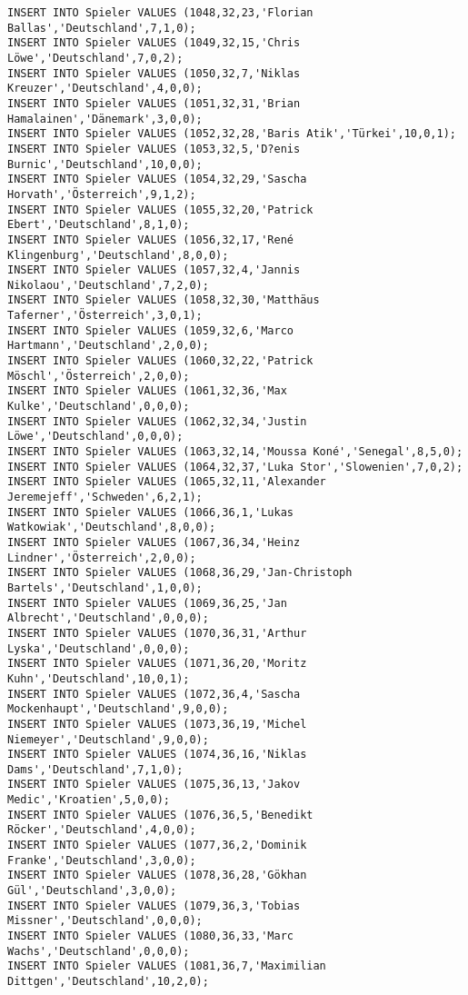 \documentclass{lehramt-informatik-aufgabe}
\begin{document}
\begin{verbatim}
INSERT INTO Spieler VALUES (1048,32,23,'Florian Ballas','Deutschland',7,1,0);
INSERT INTO Spieler VALUES (1049,32,15,'Chris Löwe','Deutschland',7,0,2);
INSERT INTO Spieler VALUES (1050,32,7,'Niklas Kreuzer','Deutschland',4,0,0);
INSERT INTO Spieler VALUES (1051,32,31,'Brian Hamalainen','Dänemark',3,0,0);
INSERT INTO Spieler VALUES (1052,32,28,'Baris Atik','Türkei',10,0,1);
INSERT INTO Spieler VALUES (1053,32,5,'D?enis Burnic','Deutschland',10,0,0);
INSERT INTO Spieler VALUES (1054,32,29,'Sascha Horvath','Österreich',9,1,2);
INSERT INTO Spieler VALUES (1055,32,20,'Patrick Ebert','Deutschland',8,1,0);
INSERT INTO Spieler VALUES (1056,32,17,'René Klingenburg','Deutschland',8,0,0);
INSERT INTO Spieler VALUES (1057,32,4,'Jannis Nikolaou','Deutschland',7,2,0);
INSERT INTO Spieler VALUES (1058,32,30,'Matthäus Taferner','Österreich',3,0,1);
INSERT INTO Spieler VALUES (1059,32,6,'Marco Hartmann','Deutschland',2,0,0);
INSERT INTO Spieler VALUES (1060,32,22,'Patrick Möschl','Österreich',2,0,0);
INSERT INTO Spieler VALUES (1061,32,36,'Max Kulke','Deutschland',0,0,0);
INSERT INTO Spieler VALUES (1062,32,34,'Justin Löwe','Deutschland',0,0,0);
INSERT INTO Spieler VALUES (1063,32,14,'Moussa Koné','Senegal',8,5,0);
INSERT INTO Spieler VALUES (1064,32,37,'Luka Stor','Slowenien',7,0,2);
INSERT INTO Spieler VALUES (1065,32,11,'Alexander Jeremejeff','Schweden',6,2,1);
INSERT INTO Spieler VALUES (1066,36,1,'Lukas Watkowiak','Deutschland',8,0,0);
INSERT INTO Spieler VALUES (1067,36,34,'Heinz Lindner','Österreich',2,0,0);
INSERT INTO Spieler VALUES (1068,36,29,'Jan-Christoph Bartels','Deutschland',1,0,0);
INSERT INTO Spieler VALUES (1069,36,25,'Jan Albrecht','Deutschland',0,0,0);
INSERT INTO Spieler VALUES (1070,36,31,'Arthur Lyska','Deutschland',0,0,0);
INSERT INTO Spieler VALUES (1071,36,20,'Moritz Kuhn','Deutschland',10,0,1);
INSERT INTO Spieler VALUES (1072,36,4,'Sascha Mockenhaupt','Deutschland',9,0,0);
INSERT INTO Spieler VALUES (1073,36,19,'Michel Niemeyer','Deutschland',9,0,0);
INSERT INTO Spieler VALUES (1074,36,16,'Niklas Dams','Deutschland',7,1,0);
INSERT INTO Spieler VALUES (1075,36,13,'Jakov Medic','Kroatien',5,0,0);
INSERT INTO Spieler VALUES (1076,36,5,'Benedikt Röcker','Deutschland',4,0,0);
INSERT INTO Spieler VALUES (1077,36,2,'Dominik Franke','Deutschland',3,0,0);
INSERT INTO Spieler VALUES (1078,36,28,'Gökhan Gül','Deutschland',3,0,0);
INSERT INTO Spieler VALUES (1079,36,3,'Tobias Missner','Deutschland',0,0,0);
INSERT INTO Spieler VALUES (1080,36,33,'Marc Wachs','Deutschland',0,0,0);
INSERT INTO Spieler VALUES (1081,36,7,'Maximilian Dittgen','Deutschland',10,2,0);

\end{verbatim}
\end{document}
